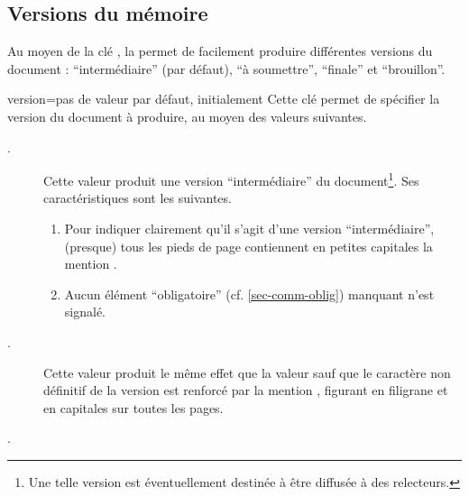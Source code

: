 \subsection{Versions du mémoire}\label{sec-versions}
%

Au moyen de la clé , la \yatCl{} permet de facilement produire
différentes versions du document : \enquote{intermédiaire} (par défaut),
\enquote{à soumettre}, \enquote{finale} et \enquote{brouillon}.

{
  \begin{docKey}{version}{=\textbar{}\textbar{}\textbar{}\textbar{}\textbar{}}{pas
      de valeur par défaut, initialement }
    Cette clé permet de spécifier la version du document à produire, au moyen
    des valeurs suivantes.
    \begin{description}
    \item[.]%
      Cette valeur produit une version
      \enquote{intermédiaire} du document\footnote{Une telle version est
        éventuellement destinée à être diffusée à des relecteurs.}. Ses
      caractéristiques sont les suivantes.
      \begin{enumerate}
      \item\label{item:inprogress:1} Pour indiquer clairement qu'il s'agit d'une
        version \enquote{intermédiaire}, (presque) tous les pieds de
        page contiennent en petites capitales la mention
        .
      \item\label{item:inprogress:2} Aucun élément \enquote{obligatoire}
        (cf. \vref{sec-comm-oblig}) manquant n'est signalé.
      \end{enumerate}
    \item[.]%
      Cette valeur produit le même effet que la valeur 
      sauf que le caractère non définitif de la version est renforcé par la
      mention , figurant en
      filigrane et en capitales sur toutes les pages.
    \item[.]%

\end{description}
\end{docKey}}
